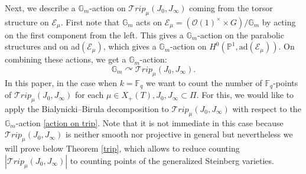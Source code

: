 \documentclass{amsart}
\newcommand{\cE}{\mathcal{E}}
\newcommand{\gm}{\mathbb{G}_{m}}
\theoremstyle{plain}
\newtheorem{notation}{Notation}[section]
\theoremstyle{definition}
\theoremstyle{remark}
\begin{document}
Next, we describe a $\gm$-action on $\mathcal{T}rip_{\mu}(J_{0},J_{\infty})$ coming from the torsor structure on $\cE_{\mu}$. First note that $\mathbb{G}_{m}$ acts on $\cE_{\mu}=(\mathcal{O}(1)^{\times}\times G)/\mathbb{G}_{m}$ by acting on the first component from the left. This gives a $\mathbb{G}_{m}$-action on the parabolic structures and on ad$(\cE_{\mu})$, which gives a $\mathbb{G}_{m}$-action on $H^{0}(\mathbb{P}^{1},\text{ad}(\cE_{\mu}))$. On combining these actions, we get a $\mathbb{G}_{m}$-action:
\begin{equation}\label{action on trip}
    \gm\curvearrowright\mathcal{T}rip_{\mu}(J_{0},J_{\infty}).
\end{equation}
In this paper, in the case when $k=\mathbb{F}_{q}$ we want to count the number of $\mathbb{F}_{q}$-points of $\mathcal{T}rip_{\mu}(J_{0},J_{\infty})$ for each $\mu\in X_{+}(T),J_{0},J_{\infty}\subset\Pi$. For this, we would like to apply the Bialynicki--Birula decomposition to $\mathcal{T}rip_{\mu}(J_{0},J_{\infty})$ with respect to the $\gm$-action \eqref{action on trip}. Note that it is not immediate in this case because $\mathcal{T}rip_{\mu}(J_{0},J_{\infty})$ is neither smooth nor projective in general but nevertheless we will prove below Theorem \ref{trip}, which allows to reduce counting $|\mathcal{T}rip_{\mu}(J_{0},J_{\infty})|$ to counting points of the generalized Steinberg varieties.
\end{document}
